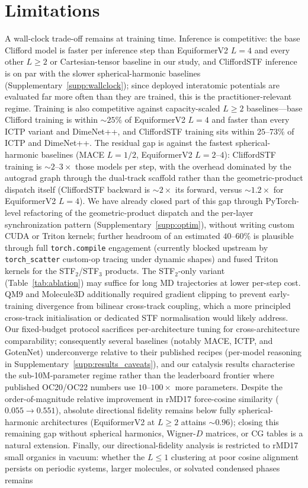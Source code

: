 \section{Limitations}\label{sec:limitations}

A wall-clock trade-off remains at training time. Inference is competitive: the base Clifford model is faster per inference step than EquiformerV2 $L{=}4$ and every other $L\!\geq\!2$ or Cartesian-tensor baseline in our study, and CliffordSTF inference is on par with the slower spherical-harmonic baselines (Supplementary~\ref{supp:wallclock}); since deployed interatomic potentials are evaluated far more often than they are trained, this is the practitioner-relevant regime. Training is also competitive against capacity-scaled $L\!\geq\!2$ baselines---base Clifford training is within $\sim\!25\%$ of EquiformerV2 $L{=}4$ and faster than every ICTP variant and DimeNet++, and CliffordSTF training sits within $25$--$73\%$ of ICTP and DimeNet++. The residual gap is against the fastest spherical-harmonic baselines (MACE $L{=}1/2$, EquiformerV2 $L{=}2$--$4$): CliffordSTF training is $\sim\!2$--$3\times$ those models per step, with the overhead dominated by the autograd graph through the dual-track scaffold rather than the geometric-product dispatch itself (CliffordSTF backward is $\sim\!2\times$ its forward, versus $\sim\!1.2\times$ for EquiformerV2 $L{=}4$). We have already closed part of this gap through PyTorch-level refactoring of the geometric-product dispatch and the per-layer synchronization pattern (Supplementary~\ref{supp:optim}), without writing custom CUDA or Triton kernels; further headroom of an estimated $40$--$60\%$ is plausible through full \texttt{torch.compile} engagement (currently blocked upstream by \texttt{torch\_scatter} custom-op tracing under dynamic shapes) and fused Triton kernels for the STF$_2$/STF$_3$ products. The STF$_2$-only variant (Table~\ref{tab:ablation}) may suffice for long MD trajectories at lower per-step cost. QM9 and Molecule3D additionally required gradient clipping to prevent early-training divergence from bilinear cross-track coupling, which a more principled cross-track initialisation or dedicated STF normalisation would likely address. Our fixed-budget protocol sacrifices per-architecture tuning for cross-architecture comparability; consequently several baselines (notably MACE, ICTP, and GotenNet) underconverge relative to their published recipes (per-model reasoning in Supplementary~\ref{supp:results_caveats}), and our catalysis results characterise the sub-10M-parameter regime rather than the leaderboard frontier where published OC20/OC22 numbers use $10$--$100\times$ more parameters. Despite the order-of-magnitude relative improvement in rMD17 force-cosine similarity ($0.055 \rightarrow 0.551$), absolute directional fidelity remains below fully spherical-harmonic architectures (EquiformerV2 at $L\!\geq\!2$ attains $\sim\!0.96$); closing this remaining gap without spherical harmonics, Wigner-$D$ matrices, or CG tables is a natural extension. Finally, our directional-fidelity analysis is restricted to rMD17 small organics in vacuum: whether the $L \leq 1$ clustering at poor cosine alignment persists on periodic systems, larger molecules, or solvated condensed phases remains 